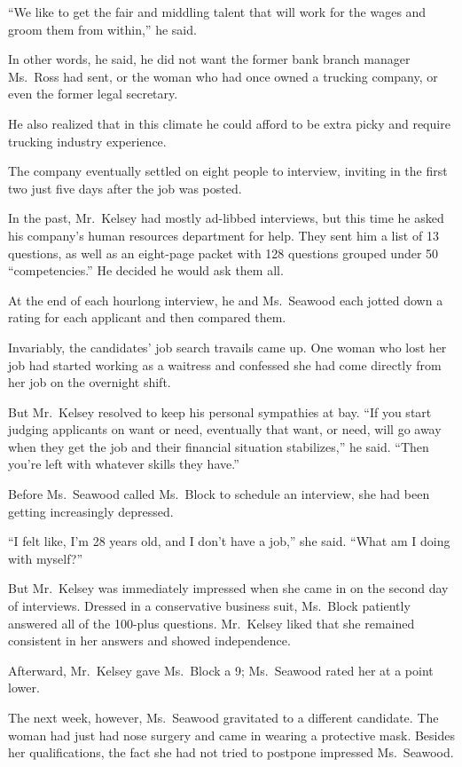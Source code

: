 ﻿\documentclass[12pt]{article}
\begin{document}
``We like to get the fair and middling talent that will work for the wages and groom them from
within,'' he said.

In other words, he said, he did not want the former bank branch manager Ms.~Ross had sent, or the
woman who had once owned a trucking company, or even the former legal secretary.

He also realized that in this climate he could afford to be extra picky and require trucking
industry experience.

The company eventually settled on eight people to interview, inviting in the first two just five
days after the job was posted.

In the past, Mr.~Kelsey had mostly ad-libbed interviews, but this time he asked his company's human
resources department for help. They sent him a list of 13 questions, as well as an eight-page packet
with 128 questions grouped under 50 ``competencies.'' He decided he would ask them all.

At the end of each hourlong interview, he and Ms.~Seawood each jotted down a rating for each
applicant and then compared them.

Invariably, the candidates' job search travails came up. One woman who lost her job had started
working as a waitress and confessed she had come directly from her job on the overnight shift.

But Mr.~Kelsey resolved to keep his personal sympathies at bay. ``If you start judging applicants on
want or need, eventually that want, or need, will go away when they get the job and their financial
situation stabilizes,'' he said. ``Then you're left with whatever skills they have.''

Before Ms.~Seawood called Ms.~Block to schedule an interview, she had been getting increasingly
depressed.

``I felt like, I'm 28 years old, and I don't have a job,'' she said. ``What am I doing with
myself?''

But Mr.~Kelsey was immediately impressed when she came in on the second day of interviews. Dressed
in a conservative business suit, Ms.~Block patiently answered all of the 100-plus questions.
Mr.~Kelsey liked that she remained consistent in her answers and showed independence.

Afterward, Mr.~Kelsey gave Ms.~Block a 9; Ms.~Seawood rated her at a point lower.

The next week, however, Ms.~Seawood gravitated to a different candidate. The woman had just had nose
surgery and came in wearing a protective mask. Besides her qualifications, the fact she had not
tried to postpone impressed Ms.~Seawood.
\end{document}
